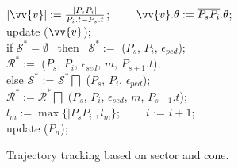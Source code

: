 \begin{figure}[tb!]
\begin{center}
{\begin{minipage}{3.3in}
{					\icc \>\hspace{7ex}    $|\vv{v}|:=\frac{|P_sP_{i}|}{P_{i}.t-P_s.t}$; ~~~~$\vv{v}.\theta:=\overline{P_sP_{i}}.\theta$; \\
					\icc \>\hspace{7ex}    update ($\vv{v}$); \\
					\icc \>\hspace{3ex} if $\mathcal{S}^*=\emptyset$ ~then~ $\mathcal{S}^*:=$ ($P_s$, $P_{i}$, $\epsilon_{ped}$);\\
					\icc \>\hspace{7ex}     $\mathcal{R}^*:=$ ($P_s$, $P_{i}$, $\epsilon_{sed}$, $m$, $P_{s+1}.t$); \\
					\icc \>\hspace{3ex} else $\mathcal{S}^*$ := $\mathcal{S}^*\bigsqcap$ ($P_s$, $P_{i}$, $\epsilon_{ped}$); \\
					\icc \>\hspace{7ex}     $\mathcal{R}^*:=\mathcal{R}^*\bigsqcap$ ($P_s$, $P_{i}$, $\epsilon_{sed}$, $m$, $P_{s+1}.t$);\\
					\icc \>\hspace{3ex} $l_{m} := \max\{|P_sP_{i}|, l_{m}\}$;  ~~~~$i$ := $i +1$;\\
					\icc \>\hspace{0ex} update ($P_{n}$); 
				}
				\vspace{-2ex}
				\myhrule
			\end{minipage}
		}
	\end{center}
	\vspace{-2ex}
	\caption{\small Trajectory tracking based on sector and cone.}
	\label{alg:bitt}
	\vspace{-2ex}
\end{figure}

